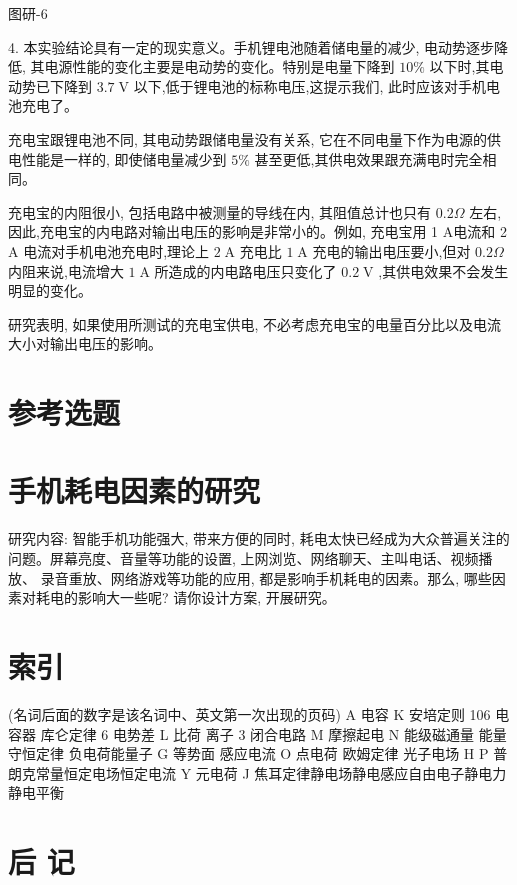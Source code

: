 \documentclass[10pt]{article}
\begin{document}
图研-6

4. 本实验结论具有一定的现实意义。手机锂电池随着储电量的减少, 电动势逐步降低, 其电源性能的变化主要是电动势的变化。特别是电量下降到 \({10}\%\) 以下时,其电动势已下降到 \({3.7}\mathrm{\;V}\) 以下,低于锂电池的标称电压,这提示我们, 此时应该对手机电池充电了。

充电宝跟锂电池不同, 其电动势跟储电量没有关系, 它在不同电量下作为电源的供电性能是一样的, 即使储电量减少到 \(5\%\) 甚至更低,其供电效果跟充满电时完全相同。

充电宝的内阻很小, 包括电路中被测量的导线在内, 其阻值总计也只有 \({0.2\Omega }\) 左右,因此,充电宝的内电路对输出电压的影响是非常小的。例如, 充电宝用 1 A电流和 2 A 电流对手机电池充电时,理论上 \(2\mathrm{\;A}\) 充电比 \(1\mathrm{\;A}\) 充电的输出电压要小,但对 \({0.2\Omega }\) 内阻来说,电流增大 \(1\mathrm{\;A}\) 所造成的内电路电压只变化了 \({0.2}\mathrm{\;V}\) ,其供电效果不会发生明显的变化。

研究表明, 如果使用所测试的充电宝供电, 不必考虑充电宝的电量百分比以及电流大小对输出电压的影响。

\section*{参考选题}

\section*{手机耗电因素的研究}

研究内容: 智能手机功能强大, 带来方便的同时, 耗电太快已经成为大众普遍关注的问题。屏幕亮度、音量等功能的设置, 上网浏览、网络聊天、主叫电话、视频播放、 录音重放、网络游戏等功能的应用, 都是影响手机耗电的因素。那么, 哪些因素对耗电的影响大一些呢? 请你设计方案, 开展研究。

\section*{索引}

(名词后面的数字是该名词中、英文第一次出现的页码) A 电容 K 安培定则 106 电容器 库仑定律 6 电势差 L 比荷 离子 3 闭合电路 M 摩擦起电 N 能级磁通量 能量守恒定律 负电荷能量子 G 等势面 感应电流 O 点电荷 欧姆定律 光子电场 H P 普朗克常量恒定电场恒定电流 Y 元电荷 J 焦耳定律静电场静电感应自由电子静电力静电平衡

\section*{后 记}
\end{document}
